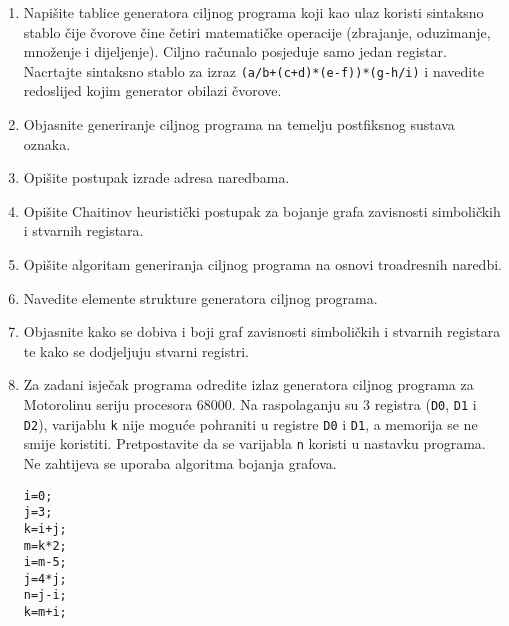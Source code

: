 \documentclass[times, 12pt, utf8]{book}
\begin{document}
\begin{enumerate}[resume]

\item 
Napišite tablice generatora ciljnog programa koji kao ulaz koristi sintaksno stablo čije čvorove čine četiri matematičke operacije (zbrajanje, oduzimanje, množenje i dijeljenje).
Ciljno računalo posjeduje samo jedan registar. 
Nacrtajte sintaksno stablo za izraz \texttt{(a/b+(c+d)*(e-f))*(g-h/i)} i navedite redoslijed kojim generator obilazi čvorove. \cite[str.~281-284]{udzbenik}

\item
Objasnite generiranje ciljnog programa na temelju postfiksnog sustava oznaka. \cite[str.~279-280]{udzbenik}

\item
Opišite postupak izrade adresa naredbama. \cite[str.~268]{udzbenik}

\item
Opišite Chaitinov heuristički postupak za bojanje grafa zavisnosti simboličkih i stvarnih registara. \cite[str.~273]{udzbenik}

\item
Opišite algoritam generiranja ciljnog programa na osnovi troadresnih naredbi. \cite[str.~276-279]{udzbenik}

\item
Navedite elemente strukture generatora ciljnog programa. \cite[str.~265]{udzbenik}

\item
Objasnite kako se dobiva i boji graf zavisnosti simboličkih i stvarnih registara te kako se dodjeljuju stvarni registri. \cite[str.~269-273]{udzbenik}

\item
Za zadani isječak programa odredite izlaz generatora ciljnog programa za Motorolinu seriju procesora 68000.
Na raspolaganju su 3 registra (\texttt{D0}, \texttt{D1} i \texttt{D2}), varijablu \texttt{k} nije moguće pohraniti u registre \texttt{D0} i \texttt{D1}, a memorija se ne smije koristiti.
Pretpostavite da se varijabla \texttt{n} koristi u nastavku programa. 
Ne zahtijeva se uporaba algoritma bojanja grafova.

\begin{alltt}
i=0;
j=3;
k=i+j;
m=k*2;
i=m-5;
j=4*j;
n=j-i;
k=m+i;
\end{alltt}


\end{enumerate}
\end{document}
